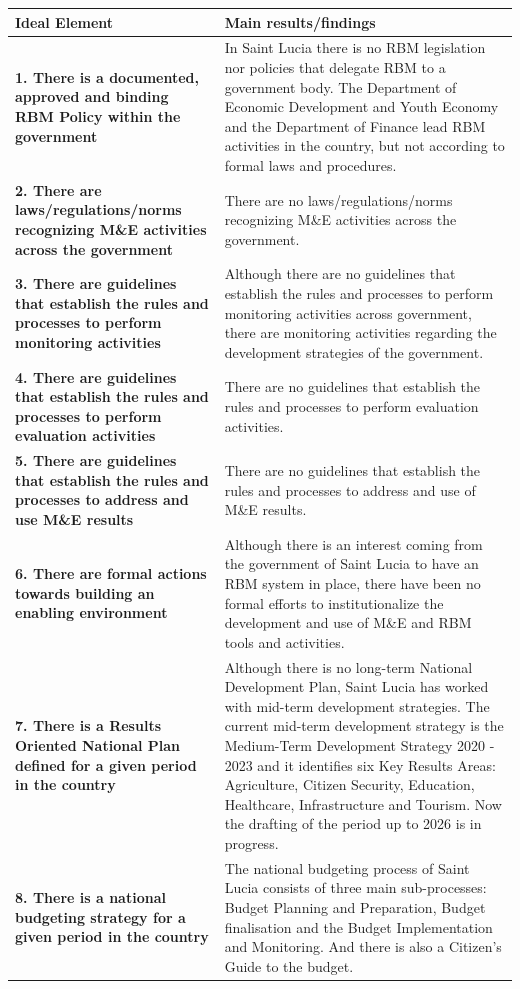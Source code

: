 \documentclass[
  10pt,
]{book}
\begin{document}
\begin{tabu} to 
\hline
Ideal Element & Main results/findings\\
\hline
\textbf{1. There is a documented, approved and binding RBM Policy within the government} & In Saint Lucia there is no RBM legislation nor policies that delegate RBM to a government body. The Department of Economic Development and Youth Economy and the Department of Finance lead RBM activities in the country, but not according to formal laws and procedures.\\
\hline
\textbf{2. There are laws/regulations/norms recognizing M\&E activities across the government} & There are no laws/regulations/norms recognizing M\&E activities across the government.\\
\hline
\textbf{3. There are guidelines that establish the rules and processes to perform monitoring activities} & Although there are no guidelines that establish the rules and processes to perform monitoring activities across government, there are monitoring activities regarding the development strategies of the government.\\
\hline
\textbf{4. There are guidelines that establish the rules and processes to perform evaluation activities} & There are no guidelines that establish the rules and processes to perform evaluation activities.\\
\hline
\textbf{5. There are guidelines that establish the rules and processes to address and use M\&E results} & There are no guidelines that establish the rules and processes to address and use of M\&E results.\\
\hline
\textbf{6. There are formal actions towards building an enabling environment} & Although there is an interest coming from the government of Saint Lucia to have an RBM system in place, there have been no formal efforts to institutionalize the development and use of M\&E and RBM tools and activities.\\
\hline
\textbf{7. There is a Results Oriented National Plan defined for a given period in the country} & Although there is no long-term National Development Plan, Saint Lucia has worked with mid-term development strategies. The current mid-term development strategy is the Medium-Term Development Strategy 2020 - 2023 and it identifies six Key Results Areas: Agriculture, Citizen Security, Education, Healthcare, Infrastructure and Tourism. Now the drafting of the period up to 2026 is in progress.\\
\hline
\textbf{8. There is a national budgeting strategy for a given period in the country} & The national budgeting process of Saint Lucia consists of three main sub-processes: Budget Planning and Preparation, Budget finalisation and the Budget Implementation and Monitoring. And there is also a Citizen's Guide to the budget.\\
\hline
\end{tabu}
\endgroup{}
\end{document}
